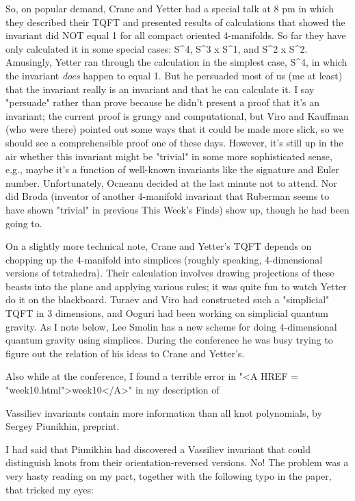 So, on popular demand, Crane and Yetter had a special talk at 8 pm in
which they described their TQFT and presented results of
calculations that showed the invariant did NOT equal 1 for all compact
oriented 4-manifolds.  So far they have only calculated it in some
special cases: S^4, S^3 x S^1, and S^2 x S^2.  Amusingly, Yetter ran
through the calculation in the simplest case, S^4, in which the
invariant \emph{does} happen to equal 1.  But he persuaded most of us (me at
least) that the invariant really is an invariant and that he can
calculate it.  I say "persuade" rather than prove because he didn't
present a proof that it's an invariant; the current proof is grungy and
computational, but Viro and Kauffman (who were there) pointed out some
ways that it could be made more slick, so we should see a comprehensible
proof one of these days.  However, it's still up in the air whether this
invariant might be "trivial" in some more sophisticated sense, e.g.,
maybe it's a function of well-known invariants like the signature and
Euler number.  Unfortunately, Ocneanu decided at the last minute not to
attend.  Nor did Broda (inventor of another 4-manifold invariant that
Ruberman seems to have shown "trivial" in previous This Week's Finds)
show up, though he had been going to.  

On a slightly more technical note, Crane and Yetter's TQFT depends on
chopping up the 4-manifold into simplices (roughly speaking,
4-dimensional versions of tetrahedra).  Their calculation involves
drawing projections of these beasts into the plane and applying various
rules; it was quite fun to watch Yetter do it on the blackboard.  Turaev
and Viro had constructed such a "simplicial" TQFT in 3 dimensions, and
Ooguri had been working on simplicial quantum gravity.  As I note below,
Lee Smolin has a new scheme for doing 4-dimensional quantum gravity
using simplices.  During the conference he was busy trying to figure out
the relation of his ideas to Crane and Yetter's.

Also while at the conference, I found a terrible error in "<A HREF = "week10.html">week10</A>" in my
description of 

	Vassiliev invariants contain more information than all knot
	polynomials, by Sergey Piunikhin, preprint.

I had said that Piunikhin had discovered a Vassiliev invariant that
could distinguish knots from their orientation-reversed versions.  No!
The problem was a very hasty reading on my part, together with the
following typo in the paper, that tricked my eyes:

